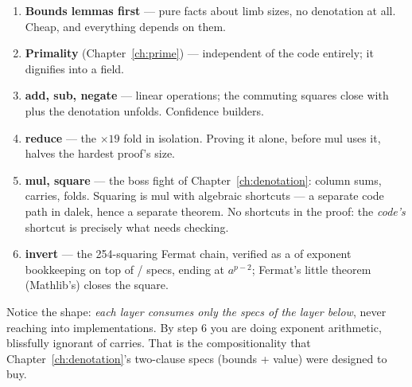 \begin{enumerate}[leftmargin=1.6em]
\item \textbf{Bounds lemmas first} --- pure  facts about limb
  sizes, no denotation at all. Cheap, and everything depends on them.
\item \textbf{Primality} (Chapter~\ref{ch:prime}) --- independent of the
  code entirely; it dignifies  into a field.
\item \textbf{add, sub, negate} --- linear operations; the commuting squares
  close with  plus the denotation unfolds. Confidence builders.
\item \textbf{reduce} --- the $\times 19$ fold in isolation. Proving it
  alone, before mul uses it, halves the hardest proof's size.
\item \textbf{mul, square} --- the boss fight of Chapter~\ref{ch:denotation}:
  column sums, carries, folds. Squaring is mul with algebraic shortcuts ---
  a separate code path in dalek, hence a separate theorem. No shortcuts
  in the proof: the \emph{code's} shortcut is precisely what needs checking.
\item \textbf{invert} --- the 254-squaring Fermat chain, verified as a
   of exponent bookkeeping on top of /
  specs, ending at $a^{p-2}$; Fermat's little theorem (Mathlib's) closes
  the square.
\end{enumerate}

Notice the shape: \emph{each layer consumes only the specs of the layer
below}, never reaching into implementations. By step 6 you are doing exponent
arithmetic, blissfully ignorant of carries. That is the compositionality that
Chapter~\ref{ch:denotation}'s two-clause specs (bounds + value) were designed
to buy.

